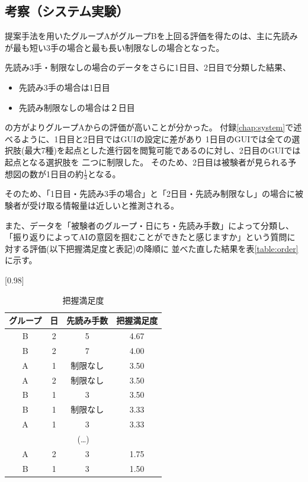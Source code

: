 \subsection{考察（システム実験）}


提案手法を用いたグループAがグループBを上回る評価を得たのは、主に先読みが最も短い3手の場合と最も長い制限なしの場合となった。

先読み3手・制限なしの場合のデータをさらに1日目、2日目で分類した結果、
\begin{itemize}
    \item 先読み3手の場合は1日目
    \item 先読み制限なしの場合は２日目
\end{itemize}

の方がよりグループAからの評価が高いことが分かった。
付録\ref{chap:system}で述べるように、1日目と2日目ではGUIの設定に差があり
1日目のGUIでは全ての選択肢(最大7種)を起点とした進行図を閲覧可能であるのに対し、2日目のGUIでは起点となる選択肢を
二つに制限した。
そのため、2日目は被験者が見られる予想図の数が1日目の約$\frac{1}{3}$となる。

そのため、「1日目・先読み3手の場合」と「2日目・先読み制限なし」の場合に被験者が受け取る情報量は近しいと推測される。

また、データを「被験者のグループ・日にち・先読み手数」によって分類し、「振り返りによってAIの意図を掴むことができたと感じますか」という質問に対する評価(以下把握満足度と表記)の降順に
並べた直した結果を表\ref{table:order}に示す。
\begin{table}[H]
	\caption{把握満足度}
    \scriptsize
    \label{table:result-imp}
	\centering
	\scalebox{0.98}[0.98]{
		\begin{tabular}{c|c|c||c}
			グループ& 日 & 先読み手数 &把握満足度 \\ \hline
			B & 2 & 5 & 4.67\\
            B & 2 & 7 & 4.00\\
            A & 1 & 制限なし& 3.50\\
            A & 2 & 制限なし& 3.50\\
            B & 1 & 3& 3.50\\
            B & 1 & 制限なし& 3.33\\
            A & 1 & 3& 3.33\\
            \multicolumn{4}{c}{(\ldots)}\\
            A & 2 & 3 & 1.75\\
            B & 1 & 3 & 1.50\\

		\end{tabular}
	}
	
\end{table}

